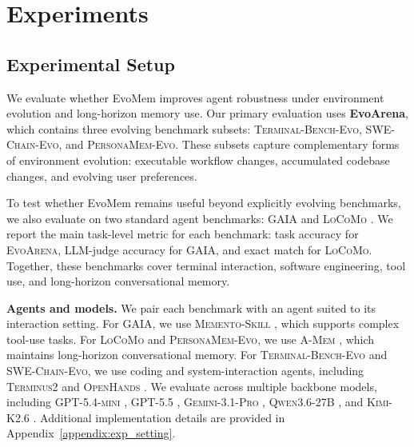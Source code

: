 \documentclass{llmxive}
\begin{document}
\vspace{-3mm}

\section{Experiments}
\subsection{Experimental Setup}

We evaluate whether EvoMem improves agent robustness under environment evolution and long-horizon memory use. Our primary evaluation uses \textbf{EvoArena}, which contains three evolving benchmark subsets: \textsc{Terminal-Bench-Evo}, \textsc{SWE-Chain-Evo}, and \textsc{PersonaMem-Evo}. These subsets capture complementary forms of environment evolution: executable workflow changes, accumulated codebase changes, and evolving user preferences.

To test whether EvoMem remains useful beyond explicitly evolving benchmarks, we also evaluate on two standard agent benchmarks: \textsc{GAIA} \cite{mialon2024gaia} and \textsc{LoCoMo} \cite{locomo}. We report the main task-level metric for each benchmark: task accuracy for \textsc{EvoArena}, LLM-judge accuracy for \textsc{GAIA}, and exact match for \textsc{LoCoMo}. Together, these benchmarks cover terminal interaction, software engineering, tool use, and long-horizon conversational memory.



\textbf{Agents and models.} \quad
We pair each benchmark with an agent suited to its interaction setting. For \textsc{GAIA}, we use \textsc{Memento-Skill} \cite{memento-s}, which supports complex tool-use tasks. For \textsc{LoCoMo} and \textsc{PersonaMem-Evo}, we use \textsc{A-Mem} \cite{xu2025amem}, which maintains long-horizon conversational memory. For \textsc{Terminal-Bench-Evo} and \textsc{SWE-Chain-Evo}, we use coding and system-interaction agents, including \textsc{Terminus2} \cite{terminal-bench} and \textsc{OpenHands} \cite{openhands}. We evaluate across multiple backbone models, including \textsc{GPT-5.4-mini} \cite{openai2026gpt54mini}, \textsc{GPT-5.5} \cite{openai2026gpt55}, \textsc{Gemini-3.1-Pro} \cite{google2026gemini31pro}, \textsc{Qwen3.6-27B} \cite{qwen2026qwen36_27b}, and \textsc{Kimi-K2.6} \cite{moonshot2026kimi_k26}. Additional implementation details are provided in Appendix~\ref{appendix:exp_setting}.
\end{document}
